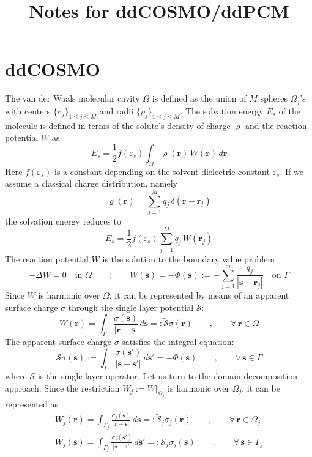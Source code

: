 \documentclass[12pt,letterpaper,oneside]{article}
\title{Notes for ddCOSMO/ddPCM}
\theoremstyle{definition}
\begin{document}
\maketitle

\section{ddCOSMO}
The van der Waals molecular cavity $\Omega$ is defined as the union of $M$ spheres $\Omega_j$'s with centers $\{\boldsymbol{r}_j \}_{1\le j \le M}$ and radii $\{ \rho_j\}_{1\le j \le M}$. The solvation energy $E_s$ of the molecule is defined in terms of the solute's density of charge $\varrho$ and the reaction potential $W$ as:
\[
E_s = \frac{1}{2} f(\varepsilon_s) \int_\Omega \varrho(\boldsymbol{r}) \, W(\boldsymbol{r}) \, d\boldsymbol{r}
\]
Here $f(\varepsilon_s)$ is a constant depending on the solvent dielectric constant $\varepsilon_s$. If we assume a classical charge distribution, namely
\[
\varrho(\boldsymbol{r}) = \sum_{j=1}^M q_j \, \delta(\boldsymbol{r} -{\boldsymbol{r}_j})
\]
the solvation energy reduces to
\begin{equation}\label{eq:1}
E_s = \frac{1}{2} f(\varepsilon_s) \sum_{j=1}^M q_j \, W(\boldsymbol{r}_j)
\end{equation}
The reaction potential $W$ is the solution to the boundary value problem
\[
-\Delta W = 0 \quad \text{in }\Omega \qquad ; \qquad W(\boldsymbol{s}) = - \Phi(\boldsymbol{s}) := - \sum_{j = 1}^m \frac{q_j}{|\boldsymbol{s} -  \boldsymbol{r}_j |} \quad \text{on }\Gamma
\]
Since $W$ is harmonic over $\Omega$, it can be represented by means of an apparent surface charge $\sigma$ through the single layer potential $\tilde{\mathcal{S}}$:
\[
W(\boldsymbol{r}) = \int_\Gamma \frac{\sigma(\boldsymbol{s})}{| \boldsymbol{r} -  \boldsymbol{s} |} \, d \boldsymbol{s} =: \tilde{\mathcal{S}} \sigma(\boldsymbol{r}) \qquad , \qquad \forall \, \boldsymbol{r} \in \Omega
\]
The apparent surface charge $\sigma$ satisfies the integral equation:
\[
\mathcal{S} \sigma (\boldsymbol{s}) := \int_\Gamma \frac{\sigma(\boldsymbol{s'})}{| \boldsymbol{s} -  \boldsymbol{s}' |} \, d \boldsymbol{s}' = -\Phi(\boldsymbol{s}) \qquad , \qquad \forall \, \boldsymbol{s} \in \Gamma
\]
where $\mathcal{S}$ is the single layer operator. Let us turn to the domain-decomposition approach. Since the restriction $W_j := W |_{\overline{\Omega}_j}$ is harmonic over $\Omega_j$, it can be represented as 
\begin{gather*}
W_j(\boldsymbol{r}) = \int_{\Gamma_j} \frac{\sigma_j(\boldsymbol{s})}{| \boldsymbol{r} -  \boldsymbol{s} |} \, d \boldsymbol{s} =: \tilde{\mathcal{S}}_j \sigma_j (\boldsymbol{r}) \qquad , \qquad \forall \, \boldsymbol{r} \in \Omega_j \\
W_j(\boldsymbol{s}) = \int_{\Gamma_j} \frac{\sigma_j(\boldsymbol{s}')}{| \boldsymbol{s} -  \boldsymbol{s}' |} \, d \boldsymbol{s}' =: \mathcal{S}_j \sigma_j (\boldsymbol{s}) \qquad , \qquad \forall \, \boldsymbol{s} \in \Gamma_j
\end{gather*}
\end{document}
